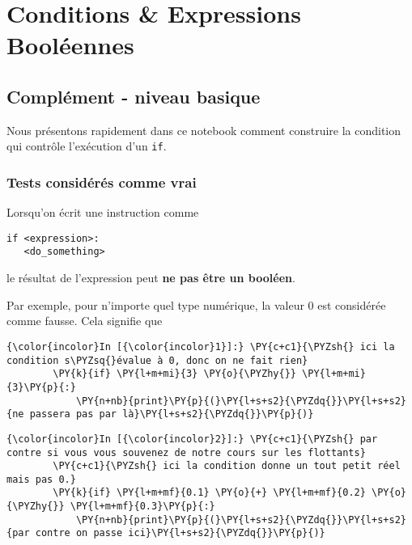     
    
    
    

    

    \hypertarget{conditions-expressions-booluxe9ennes}{%
\section{Conditions \& Expressions
Booléennes}\label{conditions-expressions-booluxe9ennes}}

    \hypertarget{compluxe9ment---niveau-basique}{%
\subsection{Complément - niveau
basique}\label{compluxe9ment---niveau-basique}}

    Nous présentons rapidement dans ce notebook comment construire la
condition qui contrôle l'exécution d'un \texttt{if}.

    \hypertarget{tests-considuxe9ruxe9s-comme-vrai}{%
\subsubsection{Tests considérés comme
vrai}\label{tests-considuxe9ruxe9s-comme-vrai}}

    Lorsqu'on écrit une instruction comme

\begin{verbatim}
if <expression>:
   <do_something>
\end{verbatim}

le résultat de l'expression peut \textbf{ne pas être un booléen}.

Par exemple, pour n'importe quel type numérique, la valeur 0 est
considérée comme fausse. Cela signifie que

    \begin{Verbatim}[commandchars=\\\{\}]
{\color{incolor}In [{\color{incolor}1}]:} \PY{c+c1}{\PYZsh{} ici la condition s\PYZsq{}évalue à 0, donc on ne fait rien}
        \PY{k}{if} \PY{l+m+mi}{3} \PY{o}{\PYZhy{}} \PY{l+m+mi}{3}\PY{p}{:}
            \PY{n+nb}{print}\PY{p}{(}\PY{l+s+s2}{\PYZdq{}}\PY{l+s+s2}{ne passera pas par là}\PY{l+s+s2}{\PYZdq{}}\PY{p}{)}
\end{Verbatim}


    \begin{Verbatim}[commandchars=\\\{\}]
{\color{incolor}In [{\color{incolor}2}]:} \PY{c+c1}{\PYZsh{} par contre si vous vous souvenez de notre cours sur les flottants}
        \PY{c+c1}{\PYZsh{} ici la condition donne un tout petit réel mais pas 0.}
        \PY{k}{if} \PY{l+m+mf}{0.1} \PY{o}{+} \PY{l+m+mf}{0.2} \PY{o}{\PYZhy{}} \PY{l+m+mf}{0.3}\PY{p}{:}
            \PY{n+nb}{print}\PY{p}{(}\PY{l+s+s2}{\PYZdq{}}\PY{l+s+s2}{par contre on passe ici}\PY{l+s+s2}{\PYZdq{}}\PY{p}{)}
\end{Verbatim}


